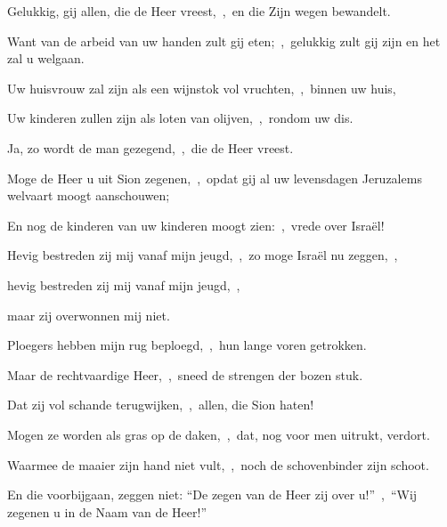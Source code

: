 \documentclass[12pt,twoside,a5paper]{article}
\begin{document}

\begin{halfparskip}
  Gelukkig, gij allen, die de Heer vreest,~\sep\ en die Zijn wegen bewandelt.


  Want van de arbeid van uw handen zult gij eten;~\sep\ gelukkig zult gij zijn en het zal u welgaan.

  Uw huisvrouw zal zijn als een wijnstok vol vruchten,~\sep\ binnen uw huis,

  Uw kinderen zullen zijn als loten van olijven,~\sep\ rondom uw dis.

  Ja, zo wordt de man gezegend,~\sep\ die de Heer vreest.

  Moge de Heer u uit Sion zegenen,~\sep\ opdat gij al uw levensdagen Jeruzalems welvaart moogt aanschouwen;

  En nog de kinderen van uw kinderen moogt zien:~\sep\ vrede over Israël!
\end{halfparskip}


\begin{halfparskip}
  Hevig bestreden zij mij vanaf mijn jeugd,~\sep\ zo moge Israël nu zeggen,~\sep

  hevig bestreden zij mij vanaf mijn jeugd,~\sep


  maar zij overwonnen mij niet.

  Ploegers hebben mijn rug beploegd,~\sep\ hun lange voren getrokken.

  Maar de rechtvaardige Heer,~\sep\ sneed de strengen der bozen stuk.

  Dat zij vol schande terugwijken,~\sep\ allen, die Sion haten!

  Mogen ze worden als gras op de daken,~\sep\ dat, nog voor men uitrukt, verdort.

  Waarmee de maaier zijn hand niet vult,~\sep\ noch de schovenbinder zijn schoot.

  En die voorbijgaan, zeggen niet: ``De zegen van de Heer zij over u!''~\sep\ ``Wij zegenen u in de Naam van de Heer!''
\end{halfparskip}

\end{document}
